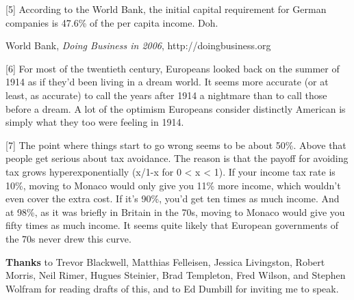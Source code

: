 {[}5{]} According to the World Bank, the initial capital requirement for
German companies is 47.6\% of the per capita income. Doh.

World Bank, \emph{Doing Business in 2006}, http://doingbusiness.org

{[}6{]} For most of the twentieth century, Europeans looked back on the
summer of 1914 as if they'd been living in a dream world. It seems more
accurate (or at least, as accurate) to call the years after 1914 a
nightmare than to call those before a dream. A lot of the optimism
Europeans consider distinctly American is simply what they too were
feeling in 1914.

{[}7{]} The point where things start to go wrong seems to be about 50\%.
Above that people get serious about tax avoidance. The reason is that
the payoff for avoiding tax grows hyperexponentially (x/1-x for 0
\textless{} x \textless{} 1). If your income tax rate is 10\%, moving to
Monaco would only give you 11\% more income, which wouldn't even cover
the extra cost. If it's 90\%, you'd get ten times as much income. And at
98\%, as it was briefly in Britain in the 70s, moving to Monaco would
give you fifty times as much income. It seems quite likely that European
governments of the 70s never drew this curve.

\textbf{Thanks} to Trevor Blackwell, Matthias Felleisen, Jessica
Livingston, Robert Morris, Neil Rimer, Hugues Steinier, Brad Templeton,
Fred Wilson, and Stephen Wolfram for reading drafts of this, and to Ed
Dumbill for inviting me to speak.

